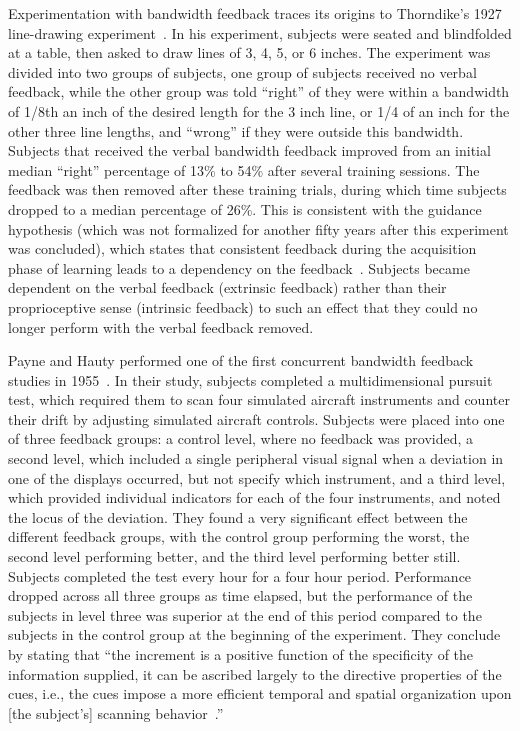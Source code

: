 \documentclass[float=false, crop=false]{standalone}
\begin{document}
Experimentation with bandwidth feedback traces its origins to Thorndike's 1927 line-drawing experiment~\cite{thorndike1927law}.
In his experiment, subjects were seated and blindfolded at a table, then asked to draw lines of 3, 4, 5, or 6 inches.
The experiment was divided into two groups of subjects, one group of subjects received no verbal feedback, while the other group was told ``right'' of they were within a bandwidth of 1/8th an inch of the desired length for the 3 inch line, or 1/4 of an inch for the other three line lengths, and ``wrong'' if they were outside this bandwidth.
Subjects that received the verbal bandwidth feedback improved from an initial median ``right'' percentage of 13\% to 54\% after several training sessions.
The feedback was then removed after these training trials, during which time subjects dropped to a median percentage of 26\%.
This is consistent with the guidance hypothesis (which was not formalized for another fifty years after this experiment was concluded), which states that consistent feedback during the acquisition phase of learning leads to a dependency on the feedback~\cite{salmoni1984knowledge}.
Subjects became dependent on the verbal feedback (extrinsic feedback) rather than their proprioceptive sense (intrinsic feedback) to such an effect that they could no longer perform with the verbal feedback removed.

Payne and Hauty performed one of the first concurrent bandwidth feedback studies in 1955~\cite{payne1955effect}.
In their study, subjects completed a multidimensional pursuit test, which required them to scan four simulated aircraft instruments and counter their drift by adjusting simulated aircraft controls.
Subjects were placed into one of three feedback groups: a control level, where no feedback was provided, a second level, which included a single peripheral visual signal when a deviation in one of the displays occurred, but not specify which instrument, and a third level, which provided individual indicators for each of the four instruments, and noted the locus of the deviation.
They found a very significant effect between the different feedback groups, with the control group performing the worst, the second level performing better, and the third level performing better still.
Subjects completed the test every hour for a four hour period.
Performance dropped across all three groups as time elapsed, but the performance of the subjects in level three was superior at the end of this period compared to the subjects in the control group at the beginning of the experiment.
They conclude by stating that ``the increment is a positive function of the specificity of the information supplied, it can be ascribed largely to the directive properties of the cues, i.e., the cues impose a more efficient temporal and spatial organization upon [the subject's] scanning behavior~\cite{payne1955effect}.''
\end{document}
